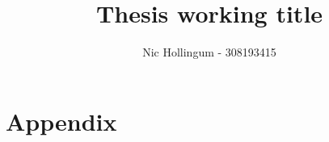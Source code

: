 \documentclass{report}
\author{Nic Hollingum - 308193415}
\title{Thesis working title}
\begin{document}
\maketitle

\tableofcontents



\chapter{Appendix}




\end{document}

